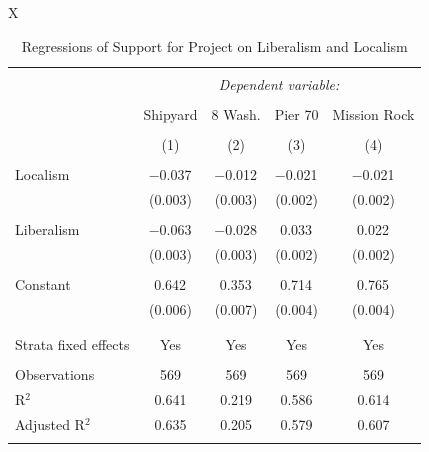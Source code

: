 \documentclass[article,11pt]{memoir}
\begin{document}
\begin{table}
  \caption{Regressions of Support for Project on Liberalism and Localism}
  \label{tab:g_support_regression}
  \begin{threeparttable}
  \scriptsize
  \begin{tabularx}{\linewidth}{X}
  \centering

  \begin{tabular}{@{\extracolsep{5pt}}lcccc} 
  \\[-1.8ex]\hline 
  \hline \\[-1.8ex] 
   & \multicolumn{4}{c}{\textit{Dependent variable:}} \\ 
  \cline{2-5} 
  \\[-1.8ex] & Shipyard & 8 Wash. & Pier 70 & Mission Rock\\ 
  \\[-1.8ex] & (1) & (2) & (3) & (4)\\ 
  \hline \\[-1.8ex] 
   Localism & $-$0.037$^{}$ & $-$0.012$^{}$ & $-$0.021$^{}$ & $-$0.021$^{}$ \\ 
    & (0.003) & (0.003) & (0.002) & (0.002) \\ 
    & & & & \\ 
   Liberalism & $-$0.063$^{}$ & $-$0.028$^{}$ & 0.033$^{}$ & 0.022$^{}$ \\ 
    & (0.003) & (0.003) & (0.002) & (0.002) \\ 
    & & & & \\ 
   Constant & 0.642$^{}$ & 0.353$^{}$ & 0.714$^{}$ & 0.765$^{}$ \\ 
    & (0.006) & (0.007) & (0.004) & (0.004) \\ 
    & & & & \\ 
  \hline \\[-1.8ex] 
  Strata fixed effects & Yes & Yes & Yes & Yes \\ 
  \hline \\[-1.8ex] 
  Observations & 569 & 569 & 569 & 569 \\ 
  R$^{2}$ & 0.641 & 0.219 & 0.586 & 0.614 \\ 
  Adjusted R$^{2}$ & 0.635 & 0.205 & 0.579 & 0.607 \\ 
  \hline 
  \hline \\[-1.8ex] 
  \end{tabular} 


\end{tabularx}
\end{threeparttable}
\end{table}
\end{document}
